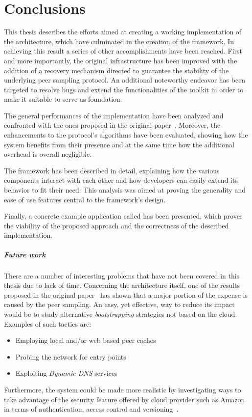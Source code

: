 \chapter{Conclusions}
This thesis describes the efforts aimed at creating a
working implementation of the \cloudcast architecture, which have
culminated in the creation of the \cloudypeer framework. In achieving
this result a series of other accomplishments have been reached. First
and more importantly, the original \cloudcast infrastructure has been
improved with the addition of a recovery mechanism directed to
guarantee the stability of the underlying peer sampling
protocol. An additional noteworthy endeavor has been targeted to resolve
bugs and extend the functionalities of the \grapes toolkit in order
to make it suitable to serve as foundation.

The general performances of the implementation have been analyzed and
confronted with the ones proposed in the original
paper~\cite{Cloudcast}. Moreover, the enhancements to the protocol's
algorithms have been evaluated, showing how the system benefits from
their presence and at the same time how the additional overhead
is overall negligible.

The \cloudypeer framework has been described in detail, explaining how
the various components interact with each other and how developers can
easily extend its behavior to fit their need. This analysis was aimed at
proving the generality and ease of use features
central to the framework's design.

Finally, a concrete example application called \cloudyrss has been presented,
which proves the viability of the proposed approach and the correctness of the
described implementation.

\paragraph{Future work}
There are a number of interesting problems that have not been covered
in this thesis due to lack of time. Concerning the \cloudcast
architecture itself, one of the results proposed in the original
paper~\cite{Cloudcast} has shown that a major portion of the expense is
caused by the peer sampling. An easy, yet effective, way to reduce its
impact would be to study alternative \textit{bootstrapping} strategies
not based on the cloud. Examples of such tactics are:
\begin{itemize}
  \item Employing local and/or web based peer
    caches~\cite{GnutellaWebCache}~\cite{P2PVPN}
  \item Probing the network for entry
    points~\cite{BootstrappingP2P}~\cite{BootstrappingP2PLocality}
    ~\cite{DecentralizedBootstrappingP2P}
    \item Exploiting \textit{Dynamic DNS}
      services~\cite{DecentralizedBootstrapping}
\end{itemize}
Furthermore, the system could be made more realistic by investigating
ways to take advantage of the security feature offered by cloud
provider such as Amazon in terms of authentication, access control and
versioning~\cite{AmazonS3DevGuide}.

